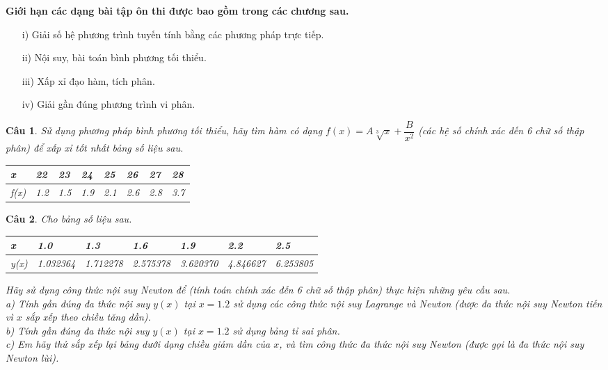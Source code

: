 \documentclass[11pt]{article}
\newtheorem{bt}{Câu}
\begin{document}


\begin{center}
	\textbf{Giới hạn các dạng bài tập ôn thi được bao gồm trong các chương sau.}
	\begin{enumerate}
		\item[i)] Giải số hệ phương trình tuyến tính bằng các phương pháp trực tiếp. 
		\item[ii)] Nội suy, bài toán bình phương tối thiểu.
		\item[iii)] Xấp xỉ đạo hàm, tích phân.
		\item[iv)] Giải gần đúng phương trình vi phân. 
	\end{enumerate}  
\end{center}

\begin{bt}
	Sử dụng phương pháp bình phương tối thiểu, hãy tìm hàm có dạng $f(x) = A \sqrt[3]{x}+ \dfrac{B}{x^2}$ (các hệ số chính xác đến 6 chữ số thập phân) để xấp xỉ tốt nhất bảng số liệu sau. 
	\begin{center}
		\begin{tabular}[5]{l|l|l|l|l|l|l|l}
			x    & 22  &  23  &  24  &  25 & 26 & 27 & 28\\ \hline
			f(x) & 1.2 & 1.5  & 1.9  & 2.1 & 2.6 & 2.8 & 3.7
		\end{tabular}	
	\end{center}
\end{bt}

\begin{bt}\label{bt2} Cho bảng số liệu sau. 
	\begin{center}
		\begin{tabular}[5]{l|l|l|l|l|l|l}
			x    & 1.0 & 1.3 & 1.6 & 1.9 & 2.2 & 2.5 \\ \hline
			y(x) & 1.032364 & 1.712278 & 2.575378 & 3.620370 & 4.846627 & 6.253805
		\end{tabular}	
	\end{center}
	Hãy sử dụng công thức nội suy Newton để (tính toán chính xác đến 6 chữ số thập phân) thực hiện những yêu cầu sau. \\
	a) Tính gần đúng đa thức nội suy $y(x)$ tại $x=1.2$ sử dụng các công thức nội suy Lagrange và Newton (được đa thức nội suy Newton tiến vì $x$ sắp xếp theo chiều tăng dần). \\
	b) Tính gần đúng đa thức nội suy $y(x)$ tại $x=1.2$ sử dụng bảng tỉ sai phân. \\
	c) Em hãy thử sắp xếp lại bảng dưới dạng chiều giảm dần của $x$, và tìm công thức đa thức nội suy Newton (được gọi là đa thức nội suy Newton lùi).	 	
\end{bt}
\end{document}
